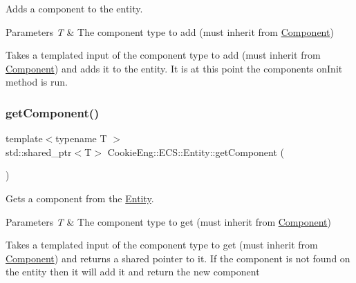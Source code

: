 Adds a component to the entity. 


\begin{DoxyParams}{Parameters}
{\em T} & The component type to add (must inherit from \hyperlink{class_cookie_eng_1_1_e_c_s_1_1_component}{Component})\\
\hline
\end{DoxyParams}
Takes a templated input of the component type to add (must inherit from \hyperlink{class_cookie_eng_1_1_e_c_s_1_1_component}{Component}) and adds it to the entity. It is at this point the components on\+Init method is run. \mbox{\label{class_cookie_eng_1_1_e_c_s_1_1_entity_a7e954d74445ccffe29412c885d97bf63}} 
\subsubsection{\texorpdfstring{get\+Component()}{getComponent()}}
{\footnotesize\ttfamily template$<$typename T $>$ \\
std\+::shared\+\_\+ptr$<$T$>$ Cookie\+Eng\+::\+E\+C\+S\+::\+Entity\+::get\+Component (\begin{DoxyParamCaption}{ }\end{DoxyParamCaption})\hspace{0.3cm}{\ttfamily [inline]}}



Gets a component from the \hyperlink{class_cookie_eng_1_1_e_c_s_1_1_entity}{Entity}. 


\begin{DoxyParams}{Parameters}
{\em T} & The component type to get (must inherit from \hyperlink{class_cookie_eng_1_1_e_c_s_1_1_component}{Component})\\
\hline
\end{DoxyParams}
Takes a templated input of the component type to get (must inherit from \hyperlink{class_cookie_eng_1_1_e_c_s_1_1_component}{Component}) and returns a shared pointer to it. If the component is not found on the entity then it will add it and return the new component \mbox{\label{class_cookie_eng_1_1_e_c_s_1_1_entity_a13d0c3e85c8cb4672371401726df4490}} 
